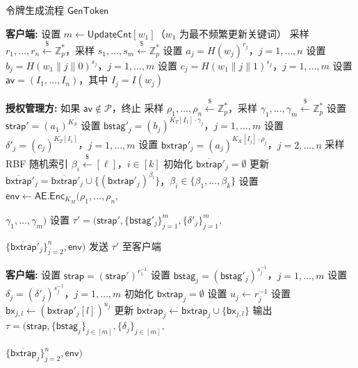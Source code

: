 \begin{breakablealgorithm}
\caption{令牌生成流程 $\mathsf{GenToken}$}
\label{alg:sse-gentoken}
\begingroup
\small
\setlength{\algorithmicindent}{1.2em}
\setlength{\columnsep}{1em}
\begin{multicols}{2}
\begin{algorithmic}[1]
\item[] \textbf{客户端:}
\STATE 设置 $m\leftarrow \mathsf{UpdateCnt}[w_1]$（$w_1$ 为最不频繁更新关键词）
\STATE 采样 $r_1,\ldots,r_n \xleftarrow{\$}\mathbb{Z}_p^*$，采样 $s_1,\ldots,s_m \xleftarrow{\$}\mathbb{Z}_p^*$
\STATE 设置 $a_j = H(w_j)^{r_j}$，$j=1,\ldots,n$
\STATE 设置 $b_j = H(w_1\|j\|0)^{s_j}$，$j=1,\ldots,m$
\STATE 设置 $c_j = H(w_1\|j\|1)^{s_j}$，$j=1,\ldots,m$
\STATE 设置 $\mathsf{av}=(I_1,\ldots,I_n)$，其中 $I_j=I(w_j)$
\item[] \textbf{授权管理方:}
\STATE 如果 $\mathsf{av}\notin \mathcal{P}$，终止
\STATE 采样 $\rho_1,\ldots,\rho_n \xleftarrow{\$}\mathbb{Z}_p^*$，采样 $\gamma_1,\ldots,\gamma_m \xleftarrow{\$}\mathbb{Z}_p^*$
\STATE 设置 $\mathsf{strap}' = (a_1)^{K_S}$
\STATE 设置 $\mathsf{bstag}'_j = (b_j)^{K_T[I_1]\cdot \gamma_j}$，$j=1,\ldots,m$
\STATE 设置 $\delta'_j = (c_j)^{K_T[I_1]}$，$j=1,\ldots,m$
\STATE 设置 $\mathsf{bxtrap}'_j = (a_j)^{K_X[I_j]\cdot \rho_j}$，$j=2,\ldots,n$
\STATE 采样 RBF 随机索引 $\beta_i \xleftarrow{\$}[\ell]$，$i\in[k]$
  \STATE 初始化 $\overline{\mathsf{bxtrap}}'_j = \emptyset$
  \STATE 更新 $\overline{\mathsf{bxtrap}}'_j = \overline{\mathsf{bxtrap}}'_j\cup\{(\mathsf{bxtrap}'_j)^{\beta_i}\}$，$\beta_i\in\{\beta_1,\ldots,\beta_k\}$
\ENDFOR
\STATE 设置 $\mathsf{env} \leftarrow \mathsf{AE.Enc}_{K_M}(\rho_1,\ldots,\rho_n,$
\item[] \hspace*{\algorithmicindent} $\gamma_1,\ldots,\gamma_m)$
\STATE 设置 $\tau'=(\mathsf{strap}',\{\mathsf{bstag}'_j\}_{j=1}^{m},\{\delta'_j\}_{j=1}^{m},$
\item[] \hspace*{\algorithmicindent} $\{\overline{\mathsf{bxtrap}}'_j\}_{j=2}^{n},\mathsf{env})$
\STATE 发送 $\tau'$ 至客户端
\item[] \textbf{客户端:}
\STATE 设置 $\mathsf{strap} = (\mathsf{strap}')^{r_1^{-1}}$
\STATE 设置 $\mathsf{bstag}_j = (\mathsf{bstag}'_j)^{s_j^{-1}}$，$j=1,\ldots,m$
\STATE 设置 $\delta_j = (\delta'_j)^{s_j^{-1}}$，$j=1,\ldots,m$
  \STATE 初始化 $\overline{\mathsf{bxtrap}}_j = \emptyset$
  \STATE 设置 $u_j\leftarrow r_j^{-1}$
      \STATE 设置 $\mathsf{bx}_{j,l}\leftarrow (\overline{\mathsf{bxtrap}}'_j[l])^{u_j}$
      \STATE 更新 $\overline{\mathsf{bxtrap}}_j\leftarrow \overline{\mathsf{bxtrap}}_j\cup\{\mathsf{bx}_{j,l}\}$
    \ENDFOR
\ENDFOR
\STATE 输出 $\tau=(\mathsf{strap},\{\mathsf{bstag}_j\}_{j\in[m]},\{\delta_j\}_{j\in[m]},$
\item[] \hspace*{\algorithmicindent} $\{\overline{\mathsf{bxtrap}}_j\}_{j=2}^{n},\mathsf{env})$
\end{algorithmic}
\end{multicols}
\endgroup
\end{breakablealgorithm}

